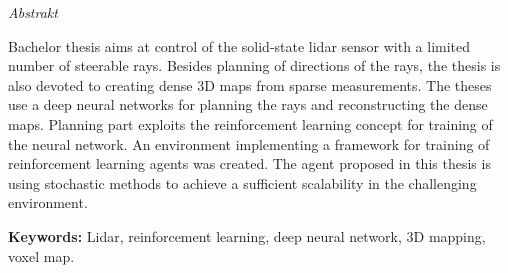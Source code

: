 \vfill
\begin{center}
{\it \large Abstrakt}
\vspace{0.2cm}

\begin{minipage}{0.8\textwidth}{
Bachelor thesis aims at control of the solid-state lidar sensor with a limited number of steerable rays. Besides planning of directions of the rays, the thesis is also devoted to creating dense 3D maps from sparse measurements. The theses use a deep neural networks for planning the rays and reconstructing the dense maps. Planning part exploits the reinforcement learning concept for training of the neural network. An environment implementing a framework for training of reinforcement learning agents was created. The agent proposed in this thesis is using stochastic methods to achieve a sufficient scalability in the challenging environment.
\vspace{3mm}
\par \textbf{Keywords:} Lidar, reinforcement learning, deep neural network, 3D mapping, voxel map.
}
\end{minipage}
\end{center}
\vfill
\vspace{1cm}
\newpage{}
